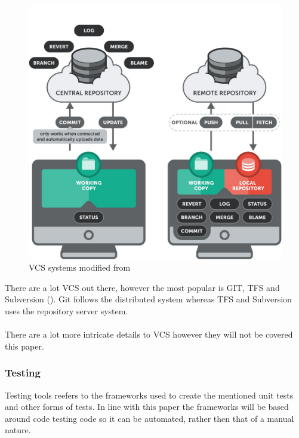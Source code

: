 \begin{figure}[H]
	\centering
	\includegraphics[scale=0.30]{images/systems.jpg}
	\caption{VCS systems modified from \cite{VCSSYSTEMS}}
	\label{fig:vcs_systems}
\end{figure}

There are a lot VCS out there, however the most popular is GIT, TFS and Subversion (\cite{vcspop}). Git follows the distributed system whereas TFS and Subversion uses the repository server system.
\\\\
There are a lot more intricate details to VCS however they will not be covered this paper.

\subsubsection{Testing}

Testing tools reefers to the frameworks used to create the mentioned unit tests and other forms of tests. In line with this paper the frameworks will be based around code testing code so it can be automated, rather then that of a manual nature.

